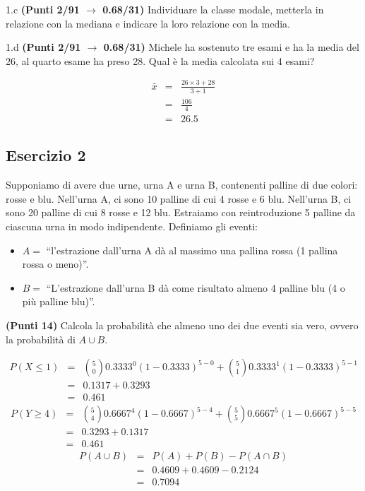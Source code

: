 \documentclass[
  11pt,
]{book}
\providecommand{\tightlist}{%
  \setlength{\itemsep}{0pt}\setlength{\parskip}{0pt}}
\theoremstyle{mytheoremstyle}
\theoremstyle{mydefstyle}
\newenvironment{sol}
  {
  \begin{tcolorbox}[enhanced,breakable,arc=0.1mm,boxrule=1pt,colback=white,colframe=iblue,
  title=\bf \fontfamily{lmss}\selectfont \hspace{.5 cm} Soluzione,drop fuzzy shadow]

}{
\end{tcolorbox}
  }
\begin{document}
1.c \textbf{(Punti 2/91 \(\rightarrow\) 0.68/31)} Individuare la classe modale, metterla in relazione con la mediana e indicare la loro relazione con la media.

1.d \textbf{(Punti 2/91 \(\rightarrow\) 0.68/31)} Michele ha sostenuto tre esami e ha la media del 26, al quarto esame ha preso 28. Qual è la media calcolata sui 4 esami?

\begin{sol}
\begin{eqnarray*}
  \bar x &=&\frac {26\times 3+28}{3+1}\\
  &=& \frac {106}{4}\\
  &=& 26.5
\end{eqnarray*}

\end{sol}

\subsection{Esercizio 2}\label{esercizio-2-34}

Supponiamo di avere due urne, urna A e urna B, contenenti palline di due colori: rosse e blu.
Nell'urna A, ci sono 10 palline di cui 4 rosse e 6 blu. Nell'urna B, ci sono 20 palline di cui 8 rosse e 12 blu.
Estraiamo con reintroduzione 5 palline da ciascuna urna in modo indipendente.
Definiamo gli eventi:

\begin{itemize}
\tightlist
\item
  \(A=\) ``l'estrazione dall'urna A dà al massimo una pallina rossa (1 pallina rossa o meno)''.
\item
  \(B=\) ``L'estrazione dall'urna B dà come risultato almeno 4 palline blu (4 o più palline blu)''.
\end{itemize}

\textbf{(Punti 14)} Calcola la probabilità che almeno uno dei due eventi sia vero, ovvero la probabilità di \(A \cup B\).

\begin{sol}
\normalsize 
\begin{eqnarray*}
      P( X \leq 1 ) &=& \binom{ 5 }{ 0 } 0.3333 ^{ 0 }(1- 0.3333 )^{ 5 - 0 }+\binom{ 5 }{ 1 } 0.3333 ^{ 1 }(1- 0.3333 )^{ 5 - 1 } \\                 &=& 0.1317+0.3293 \\                 &=& 0.461 
   \end{eqnarray*}
\normalsize  \normalsize 
\begin{eqnarray*}
      P( Y \geq 4 ) &=& \binom{ 5 }{ 4 } 0.6667 ^{ 4 }(1- 0.6667 )^{ 5 - 4 }+\binom{ 5 }{ 5 } 0.6667 ^{ 5 }(1- 0.6667 )^{ 5 - 5 } \\                 &=& 0.3293+0.1317 \\                 &=& 0.461 
   \end{eqnarray*}
\normalsize 
\begin{eqnarray*}
  P(A\cup B) &=&  P(A)+P(B)-P(A\cap B)\\
  &=& 0.4609+0.4609-0.2124\\
  &=& 0.7094
\end{eqnarray*}

\end{sol}
\end{document}
